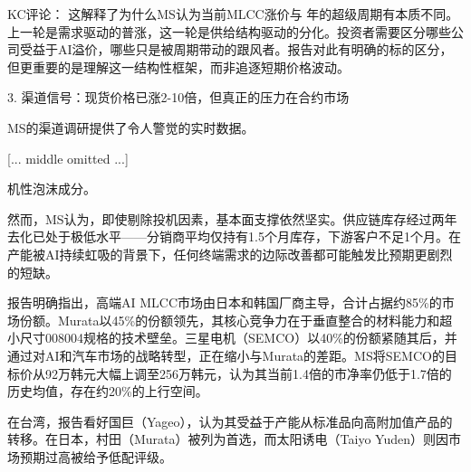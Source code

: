 \documentclass[11pt]{ctexart}
\begin{document}
KC评论： 这解释了为什么MS认为当前MLCC涨价与 年的超级周期有本质不同。上一轮是需求驱动的普涨，这一轮是供给结构驱动的分化。投资者需要区分哪些公司受益于AI溢价，哪些只是被周期带动的跟风者。报告对此有明确的标的区分，但更重要的是理解这一结构性框架，而非追逐短期价格波动。

3. 渠道信号：现货价格已涨2-10倍，但真正的压力在合约市场

MS的渠道调研提供了令人警觉的实时数据。

[... middle omitted ...]

机性泡沫成分。

然而，MS认为，即使剔除投机因素，基本面支撑依然坚实。供应链库存经过两年去化已处于极低水平——分销商平均仅持有1.5个月库存，下游客户不足1个月。在产能被AI持续虹吸的背景下，任何终端需求的边际改善都可能触发比预期更剧烈的短缺。

报告明确指出，高端AI MLCC市场由日本和韩国厂商主导，合计占据约85\%的市场份额。Murata以45\%的份额领先，其核心竞争力在于垂直整合的材料能力和超小尺寸008004规格的技术壁垒。三星电机（SEMCO）以40\%的份额紧随其后，并通过对AI和汽车市场的战略转型，正在缩小与Murata的差距。MS将SEMCO的目标价从92万韩元大幅上调至256万韩元，认为其当前1.4倍的市净率仍低于1.7倍的历史均值，存在约20\%的上行空间。

在台湾，报告看好国巨（Yageo），认为其受益于产能从标准品向高附加值产品的转移。在日本，村田（Murata）被列为首选，而太阳诱电（Taiyo Yuden）则因市场预期过高被给予低配评级。
\end{document}
